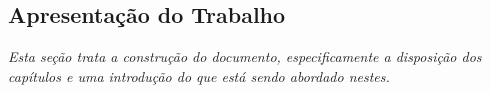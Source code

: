 

\subsection{\textbf{Apresentação do Trabalho}}
    \label{sec:apresentacao-trabalho}
    
    \textit{Esta seção trata a construção do documento, especificamente a disposição dos capítulos e uma
    introdução do que está sendo abordado nestes.}

